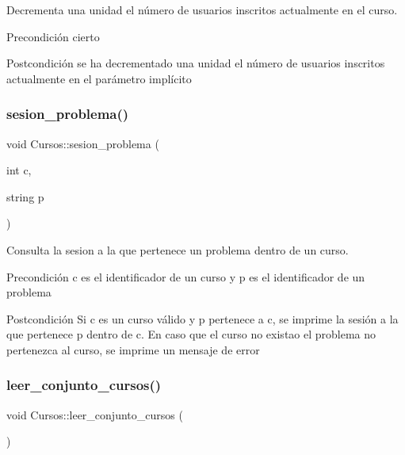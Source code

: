 Decrementa una unidad el número de usuarios inscritos actualmente en el curso. 

\begin{DoxyPrecond}{Precondición}
cierto 
\end{DoxyPrecond}
\begin{DoxyPostcond}{Postcondición}
se ha decrementado una unidad el número de usuarios inscritos actualmente en el parámetro implícito 
\end{DoxyPostcond}
\mbox{\label{class_cursos_aa5a8cdb45236245e938ba34481a788fe}} 
\subsubsection{\texorpdfstring{sesion\+\_\+problema()}{sesion\_problema()}}
{\footnotesize\ttfamily void Cursos\+::sesion\+\_\+problema (\begin{DoxyParamCaption}\item[{int}]{c,  }\item[{string}]{p }\end{DoxyParamCaption})}



Consulta la sesion a la que pertenece un problema dentro de un curso. 

\begin{DoxyPrecond}{Precondición}
c es el identificador de un curso y p es el identificador de un problema 
\end{DoxyPrecond}
\begin{DoxyPostcond}{Postcondición}
Si c es un curso válido y p pertenece a c, se imprime la sesión a la que pertenece p dentro de c. En caso que el curso no existao el problema no pertenezca al curso, se imprime un mensaje de error 
\end{DoxyPostcond}
\mbox{\label{class_cursos_a6eeda75d794cfd75a0137977d15d0cc6}} 
\subsubsection{\texorpdfstring{leer\+\_\+conjunto\+\_\+cursos()}{leer\_conjunto\_cursos()}}
{\footnotesize\ttfamily void Cursos\+::leer\+\_\+conjunto\+\_\+cursos (\begin{DoxyParamCaption}{ }\end{DoxyParamCaption})}



